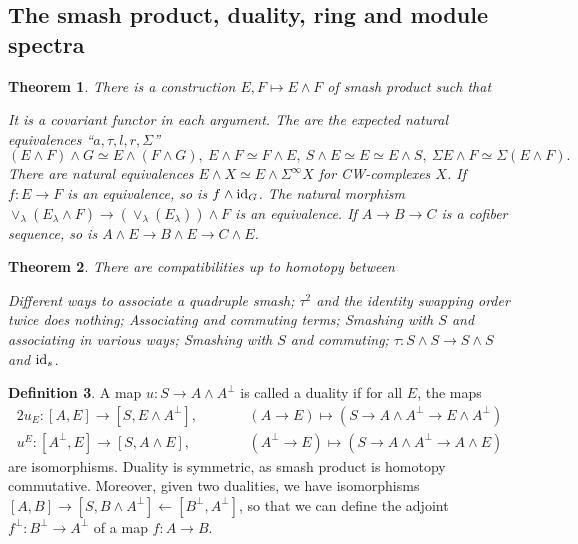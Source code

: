\documentclass[11pt]{article}
\renewcommand{\comment}{}
\theoremstyle{plain}
\newtheorem{thm}{Theorem}[subsection]
\theoremstyle{definition}
\newtheorem{defn}[thm]{Definition}
\begin{document}
\subsection{The smash product, duality, ring and module spectra}
\comment{
\begin{thm}
There is a construction $E,F\mapsto E\wedge F$ of smash product such that
\begin{itemise}
\itm[(i)]It is a covariant functor in each argument.
\itm[(ii)]The are the expected natural equivalences
``$a,\tau,l,r,\Sigma$''\upcol
\[(E\wedge F)\wedge G\simeq E\wedge(F\wedge G),\ E\wedge F\simeq F\wedge E,\
S\wedge E\simeq E\simeq E\wedge S,\ \Sigma E\wedge F\simeq \Sigma(E\wedge F).\]
\itm[(iii)]There are natural equivalences $E\wedge X\simeq E\wedge \Sigma^\infty
X$ for CW-complexes $X$.
\itm[(iv)]If $f:E\to F$ is an equivalence, so is $f\wedge \textup{id}_G$.
\itm[(v)]The natural morphism $\vee_\lambda(E_\lambda\wedge
F)\to(\vee_\lambda(E_\lambda))\wedge F$ is an equivalence.
\itm[(vi)]If $A\to B\to C$ is a cofiber sequence, so is $A\wedge E\to B\wedge
E\to C\wedge E$.
\end{itemise}
\end{thm}
\begin{thm}
There are compatibilities up to homotopy between\upcol
\begin{itemise}
\itm[(i)] Different ways to associate a quadruple smash;
\itm[(ii)] $\tau^2$ and the identity \lparen swapping order twice does
nothing\rparen;
\itm[(iii)] Associating and commuting terms;
\itm[(iv)] Smashing with $S$ and associating in various ways;
\itm[(vii)] Smashing with $S$ and commuting;
\itm[(viii)] $\tau:S\wedge S\to S\wedge S$ and $\textup{id}_s$.
\end{itemise}
\end{thm}
\begin{defn}
A map $u:S\to A\wedge A^\perp$ is called a duality if for all $E$, the maps
\begin{alignat*}{2}
u_E:[A,E]\to[S,E\wedge A^\perp],&\qquad &
(A\to E)\mapsto (S\to A\wedge A^\perp\to E\wedge A^\perp)\\
u^E:[A^\perp,E]\to[S,A\wedge E],&\qquad &
(A^\perp\to E)\mapsto (S\to A\wedge A^\perp\to A\wedge E)
\end{alignat*}
are isomorphisms. Duality is symmetric, as smash product is homotopy
commutative. Moreover, given two dualities, we have isomorphisms
$[A,B]\longrightarrow[S,B\wedge A^\perp]\longleftarrow[B^\perp,A^\perp]$, so
that we can define the adjoint $f^\perp:B^\perp\to A^\perp$ of a map $f:A\to B$.

\end{defn}}
\end{document}

